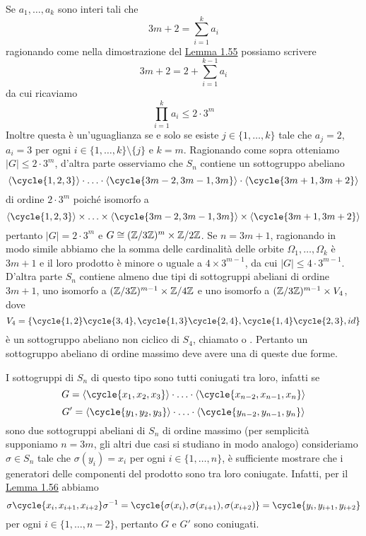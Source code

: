 \documentclass[11pt]{scrartcl}
\begin{document}
\begin{remark}
    Se $a_1, \ldots, a_k$ sono interi tali che 
    \[
        3m + 2 = \sum_{i = 1}^k a_i
    \]
    ragionando come nella dimostrazione del \hyperref[lemma4.0]{Lemma 1.55}
    possiamo scrivere
    \[
        3m + 2 = 2 + \sum_{i = 1}^{k - 1}a_i
    \]
    da cui ricaviamo
    \[
        \prod_{i = 1}^k a_i \leqslant 2\cdot3^m
    \]
    Inoltre questa è un'uguaglianza se e solo se esiste $j \in \{1, \ldots, k\}$
    tale che $a_j = 2$, $a_i = 3$ per ogni $i \in \{1, \ldots, k\}\setminus\{j\}$
    e $k = m$. Ragionando come sopra otteniamo $|G| \leqslant 2\cdot 3^m$, 
    d'altra parte osserviamo che $S_n$ contiene un sottogruppo abeliano
    \[
        \langle\cycle{1, 2, 3}\rangle\cdot\ldots\cdot\langle\cycle{3m - 2, 3m - 1, 3m}\rangle\cdot\langle\cycle{3m + 1, 3m + 2}\rangle
    \]
    di ordine $2\cdot3^m$ poiché isomorfo a 
    \[
        \langle\cycle{1, 2, 3}\rangle\times\ldots\times\langle\cycle{3m - 2, 3m - 1, 3m}\rangle\times\langle\cycle{3m + 1, 3m + 2}\rangle
    \]
    pertanto $|G| = 2\cdot3^m$ e $G \cong (\mathbb{Z}/{3}\mathbb{Z})^m \times \mathbb{Z}/{2}\mathbb{Z}$.
    Se $n = 3m + 1$, ragionando in modo simile abbiamo che la somma delle
    cardinalità delle orbite $\Omega_1, \ldots, \Omega_k$ è $3m + 1$ e il 
    loro prodotto è minore o uguale a $4\times 3^{m - 1}$, da cui $|G| \leq
    4\cdot3^{m - 1}$. D'altra parte $S_n$ contiene almeno due tipi di 
    sottogruppi abeliani di ordine $3m + 1$, uno isomorfo a 
    $(\mathbb{Z}/{3}\mathbb{Z})^{m - 1} \times \mathbb{Z}/{4}\mathbb{Z}$ e uno isomorfo a $(\mathbb{Z}/{3}\mathbb{Z})^{m - 1}\times V_4$,
    dove 
    \[
        V_4 = \{\cycle{1, 2}\cycle{3, 4}, \cycle{1, 3}\cycle{2, 4}, 
    \cycle{1, 4}\cycle{2, 3}, id\}
    \]
    è un sottogruppo abeliano non ciclico di $S_4$, chiamato 
     o . Pertanto un sottogruppo
    abeliano di ordine massimo deve avere una di queste due forme.
\end{remark}

\begin{remark}
    I sottogruppi di $S_n$ di questo tipo sono tutti coniugati tra loro, infatti
    se 
    \[
        G = \langle\cycle{x_1, x_2, x_3}\rangle\cdot\ldots\cdot\langle\cycle{x_{n - 2}, x_{n - 1}, x_n}\rangle
    \]
    \[
        G' = \langle\cycle{y_1, y_2, y_3}\rangle\cdot\ldots\cdot\langle\cycle{y_{n - 2}, y_{n - 1}, y_n}\rangle
    \]
    sono due sottogruppi abeliani di $S_n$ di ordine massimo (per semplicità
    supponiamo $n = 3m$, gli altri due casi si studiano in modo analogo)
    consideriamo $\sigma \in S_n$ tale che $\sigma(y_i) = x_i$ per ogni 
    $i \in \{1, \ldots, n\}$, è sufficiente mostrare che i generatori delle componenti del
    prodotto sono tra loro coniugate. Infatti, per il \hyperref[lemma5.0]{Lemma 1.56}
    abbiamo 
    \[
        \sigma\cycle{x_i, x_{i + 1}, x_{i + 2}}\sigma^{-1} = 
        \cycle{\sigma(x_i), \sigma(x_{i + 1}), \sigma(x_{i + 2})} = 
        \cycle{y_i, y_{i + 1}, y_{i + 2}}
    \]
    per ogni $i \in \{1, \ldots, n - 2\}$, pertanto $G$ e $G'$ sono coniugati.
\end{remark}
\end{document}
